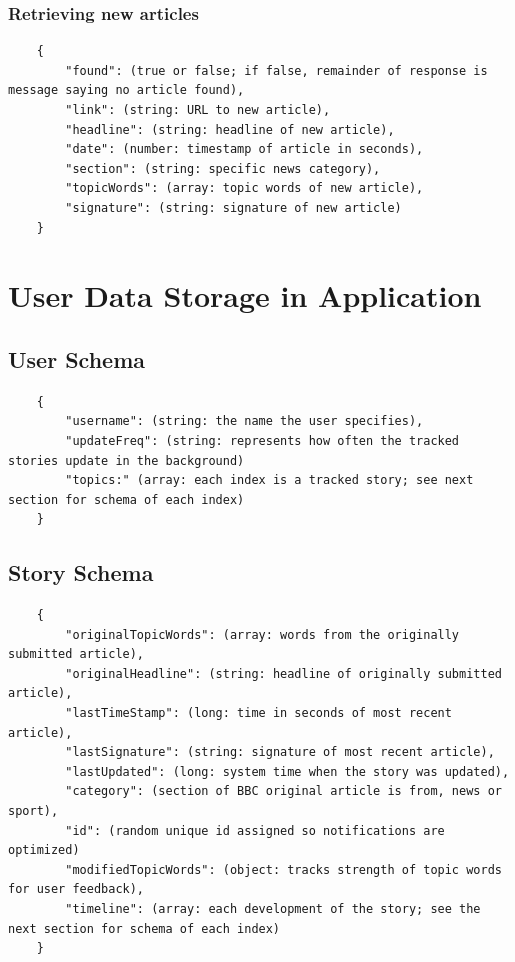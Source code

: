\documentclass[11pt,titlepage]{report}
\begin{document}
\subsection{Retrieving new articles}
\begin{lstlisting}
    {
        "found": (true or false; if false, remainder of response is message saying no article found),
        "link": (string: URL to new article),
        "headline": (string: headline of new article),
        "date": (number: timestamp of article in seconds),
        "section": (string: specific news category),
        "topicWords": (array: topic words of new article),
        "signature": (string: signature of new article)
    }
\end{lstlisting}

\chapter{User Data Storage in Application}\label{appendix:userData}
\section{User Schema}
\begin{lstlisting}
    {
        "username": (string: the name the user specifies),
        "updateFreq": (string: represents how often the tracked stories update in the background)
        "topics:" (array: each index is a tracked story; see next section for schema of each index)
    }
\end{lstlisting}
\section{Story Schema}
\begin{lstlisting}
    {
        "originalTopicWords": (array: words from the originally submitted article),
        "originalHeadline": (string: headline of originally submitted article),
        "lastTimeStamp": (long: time in seconds of most recent article),
        "lastSignature": (string: signature of most recent article),
        "lastUpdated": (long: system time when the story was updated),
        "category": (section of BBC original article is from, news or sport),
        "id": (random unique id assigned so notifications are optimized)
        "modifiedTopicWords": (object: tracks strength of topic words for user feedback),
        "timeline": (array: each development of the story; see the next section for schema of each index)
    }
\end{lstlisting}
\end{document}
